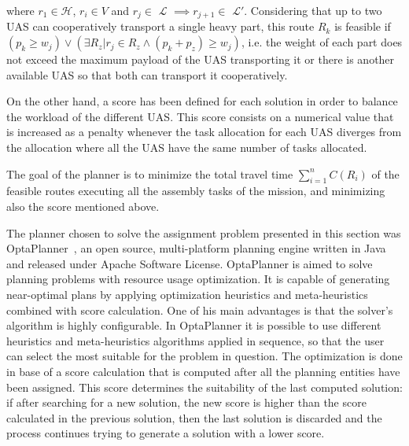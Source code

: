 \documentclass[letterpaper, 12pt, conference]{ieeeconf}    %
\begin{document}
\noindent where ${r_1 \in \mathcal{H}}$, ${r_i \in V}$ and ${r_j \in}$ $\mathcal{L}$ ${\implies r_{j+1} \in}$ $\mathcal{L'}$. Considering that up to two UAS can cooperatively transport a single heavy part, this route ${R_{k}}$ is feasible if ${(p_k \geq w_j) \lor (\exists R_{z} | r_j \in R_{z} \land (p_k+p_z) \geq w_j)}$, i.e. the weight of each part does not exceed the maximum payload of the UAS transporting it or there is another available UAS so that both can transport it cooperatively.
	
On the other hand, a score has been defined for each solution in order to balance the workload of the different UAS. This score consists on a numerical value that is increased as a penalty whenever the task allocation for each UAS diverges from the allocation where all the UAS have the same number of tasks allocated.
	
The goal of the planner is to minimize the total travel time $\sum_{i=1}^{n} C(R_{i})$ of the feasible routes executing all the assembly tasks of the mission, and minimizing also the score mentioned above.
    
The planner chosen to solve the assignment problem presented in this section was OptaPlanner~\cite{optaplanner}, an open source, multi-platform planning engine written in Java and released under Apache Software License. OptaPlanner is aimed to solve planning problems with resource usage optimization. It is capable of generating near-optimal plans by applying optimization heuristics and meta-heuristics combined with score calculation. One of his main advantages is that the solver's algorithm is highly configurable. In OptaPlanner it is possible to use different heuristics and meta-heuristics algorithms applied in sequence, so that the user can select the most suitable for the problem in question. The optimization is done in base of a score calculation that is computed after all the planning entities have been assigned. This score determines the suitability of the last computed solution: if after searching for a new solution, the new score is higher than the score calculated in the previous solution, then the last solution is discarded and the process continues trying to generate a solution with a lower score.

\end{document}
